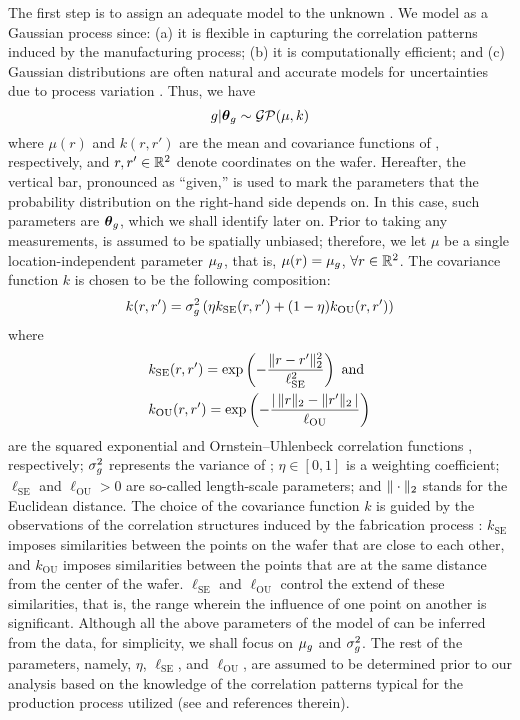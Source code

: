 The first step is to assign an adequate model to the unknown \g. We model \g as
a Gaussian process \cite{rasmussen2006} since: (a) it is flexible in capturing
the correlation patterns induced by the manufacturing process; (b) it is
computationally efficient; and (c) Gaussian distributions are often natural and
accurate models for uncertainties due to process variation \cite{srivastava2010,
reda2009, juan2012}. Thus, we have
\begin{equation} \elab{u-prior}
  \g | \vt_\g \sim \mathcal{GP}(\mu, k)
\end{equation}
where $\mu(r)$ and $k(r, r')$ are the mean and covariance functions of \g,
respectively, and $r, r' \in \real^2$ denote coordinates on the wafer.
Hereafter, the vertical bar, pronounced as ``given,'' is used to mark the
parameters that the probability distribution on the right-hand side depends on.
In this case, such parameters are $\vt_\g$, which we shall identify later on.
Prior to taking any measurements, \g is assumed to be spatially unbiased;
therefore, we let $\mu$ be a single location-independent parameter $\mu_\g$,
that is, $\mu(r) = \mu_\g$, $\forall r \in \real^2$. The covariance function $k$
is chosen to be the following composition:
\begin{equation} \elab{covariance-function}
  k(r, r') = \sigma_\g^2 \left(\eta k_\text{SE}(r, r') + (1 - \eta) k_\text{OU}(r, r')\right)
\end{equation}
where
\begin{align*}
  & k_\text{SE}(r, r') = \exp\left(-\frac{\norm[2]{r - r'}^2}{\ell_\text{SE}^2}\right) \text{ and} \\
  & k_\text{OU}(r, r') = \exp\left(-\frac{\absolute{\,\norm[2]{r} - \norm[2]{r'}\,}}{\ell_\text{OU}}\right)
\end{align*}
are the squared exponential and Ornstein--Uhlenbeck correlation functions
\cite{rasmussen2006}, respectively; $\sigma_\g^2$ represents the variance of \g;
$\eta \in [0, 1]$ is a weighting coefficient; $\ell_\text{SE}$ and
$\ell_\text{OU} > 0$ are so-called length-scale parameters; and
$\norm[2]{\cdot}$ stands for the Euclidean distance. The choice of the
covariance function $k$ is guided by the observations of the correlation
structures induced by the fabrication process \cite{chandrakasan2000,
cheng2011}: $k_\text{SE}$ imposes similarities between the points on the wafer
that are close to each other, and $k_\text{OU}$ imposes similarities between the
points that are at the same distance from the center of the wafer.
$\ell_\text{SE}$ and $\ell_\text{OU}$ control the extend of these similarities,
that is, the range wherein the influence of one point on another is significant.
Although all the above parameters of the model of \g can be inferred from the
data, for simplicity, we shall focus on $\mu_\g$ and $\sigma_\g^2$. The rest of
the parameters, namely, $\eta$, $\ell_\text{SE}$, and $\ell_\text{OU}$, are
assumed to be determined prior to our analysis based on the knowledge of the
correlation patterns typical for the production process utilized (see
\cite{marzouk2009} and references therein).

